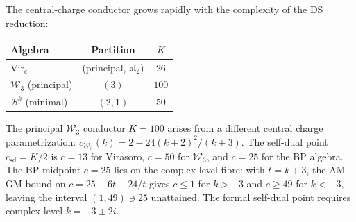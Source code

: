 \begin{remark}
\label{rem:bp-conductor-comparison}
The central-charge conductor grows rapidly with the complexity of the
DS reduction:
\begin{center}
\renewcommand{\arraystretch}{1.2}
\begin{tabular}{lcc}
\toprule
Algebra & Partition & $K$ \\
\midrule
$\mathrm{Vir}_c$ & (principal, $\mathfrak{sl}_2$) & $26$ \\
$\mathcal{W}_3$ (principal) & $(3)$ & $100$ \\
$\mathcal{B}^k$ (minimal) & $(2,1)$ & $50$ \\
\bottomrule
\end{tabular}
\end{center}
The principal $\mathcal{W}_3$ conductor $K = 100$ arises from a
different central charge parametrization: $c_{\mathcal{W}_3}(k) =
2 - 24(k{+}2)^2/(k{+}3)$. The self-dual point
$c_{\mathrm{sd}} = K/2$ is $c = 13$ for Virasoro, $c = 50$ for
$\mathcal{W}_3$, and $c = 25$ for the BP algebra.  The BP midpoint
$c=25$ lies on the complex level fibre: with $t=k+3$, the AM--GM bound
on $c = 25 - 6t - 24/t$ gives
$c \leq 1$ for $k > -3$ and $c \geq 49$ for
$k < -3$, leaving the interval $(1, 49) \ni 25$ unattained.
The formal self-dual point requires complex level
$k = -3 \pm 2i$.
\end{remark}


